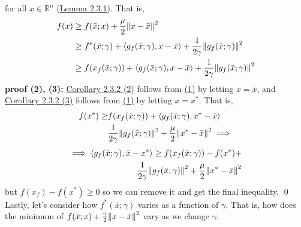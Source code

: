 \documentclass[12pt,a4paper]{article}
\begin{document}
	 for all $x \in \mathbb{R}^n$ (\hyperref[lem231]{Lemma 2.3.1}). That is,
	 \begin{align*}
	 	f(x) &\geq f(\bar{x};x) + \frac{\mu}{2}\norm{x - \bar{x}}^2 \\
	 	&\geq f^*(\bar{x};\gamma) + \langle g_f(\bar{x};\gamma), x - \bar{x} \rangle + \frac{1}{2\gamma}\norm{g_f(\bar{x};\gamma)}^2 \\
	 	&\geq f(x_f(\bar{x};\gamma)) + \langle g_f(\bar{x};\gamma), x - \bar{x} \rangle + \frac{1}{2\gamma}\norm{g_f(\bar{x};\gamma)}^2
	 \end{align*}
	 \textbf{proof (2), (3):} \hyperref[cor232_2]{Corollary 2.3.2 (2)} follows from \hyperref[cor232_1]{(1)} by letting $x = \bar{x}$, and \hyperref[cor232_3]{Corollary 2.3.2 (3)} follows from  \hyperref[cor232_1]{(1)} by letting $x = x^*$. That is,
	 \begin{align*}
	 	f(x^*) \geq &f(x_f(\bar{x};\gamma)) + \langle g_f(\bar{x};\gamma), x^* - \bar{x} \rangle \\
	 	&\frac{1}{2\gamma}\norm{g_f(\bar{x};\gamma)}^2 + \frac{\mu}{2}\norm{x^* - \bar{x}}^2 \implies
	\end{align*}
	\begin{align*}
	 	 \implies \langle g_f(\bar{x};\gamma), \bar{x} - x^* \rangle \geq f(x_f(\bar{x};\gamma)) - f(x^*) + \\ \frac{1}{2\gamma}\norm{g_f(\bar{x};\gamma)}^2 + \frac{\mu}{2}\norm{x^* - \bar{x}}^2
	 \end{align*}
	 but $f(x_f) - f(x^*) \geq 0$ so we can remove it and get the final inequality. \qed \\
	 Lastly, let's consider how $f^*(\bar{x};\gamma)$ varies as a function of $\gamma$. That is, how does the minimum of $f(\bar{x};x) + \frac{\gamma}{2}\norm{x - \bar{x}}^2$ vary as we change $\gamma$.
\end{document}
